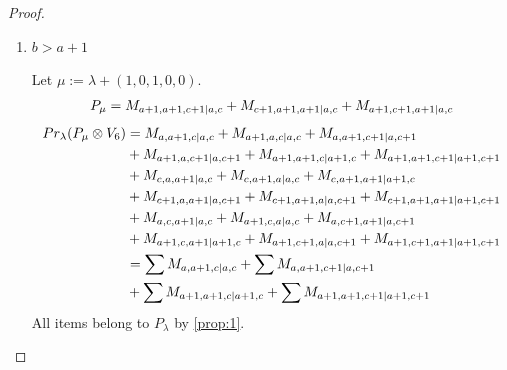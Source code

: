 \begin{proof}
\begin{enumerate}
\begin{enumerate}
        \item $b>a+1$ \par
        Let $\mu:=\lambda + (1,0,1,0,0) $.
        \begin{equation}\notag
          \begin{aligned}
            P_\mu = M_{a+1,a+1,c+1|a,c}
+ M_{c+1,a+1,a+1|a,c}
+ M_{a+1,c+1,a+1|a,c}
          \end{aligned}
        \end{equation}
        \begin{equation}\notag
          \begin{aligned}
            Pr_{\lambda}(P_\mu \otimes V_{6}) &=
M_{a,a+1,c|a,c}
+ M_{a+1,a,c|a,c}
+ M_{a,a+1,c+1|a,c+1}\\
                                               &
+ M_{a+1,a,c+1|a,c+1}
+ M_{a+1,a+1,c|a+1,c}
+ M_{a+1,a+1,c+1|a+1,c+1}\\
                                               &
+ M_{c,a,a+1|a,c}
+ M_{c,a+1,a|a,c}
+ M_{c,a+1,a+1|a+1,c}\\
                                               &
+ M_{c+1,a,a+1|a,c+1}
+ M_{c+1,a+1,a|a,c+1}
+ M_{c+1,a+1,a+1|a+1,c+1}\\
                                               &
+ M_{a,c,a+1|a,c}
+ M_{a+1,c,a|a,c}
+ M_{a,c+1,a+1|a,c+1}\\
                                               &
+ M_{a+1,c,a+1|a+1,c}
+ M_{a+1,c+1,a|a,c+1}
+ M_{a+1,c+1,a+1|a+1,c+1} \\
                                               &=
\sum M_{a,a+1,c|a,c}
+ \sum M_{a,a+1,c+1|a,c+1}\\
                                               &
+ \sum M_{a+1,a+1,c|a+1,c}
+ \sum M_{a+1,a+1,c+1|a+1,c+1}
          \end{aligned}
        \end{equation}
All items belong to $P_\lambda$ by \cref{prop:1}.
      \end{enumerate}

  \end{enumerate}

\end{proof}

